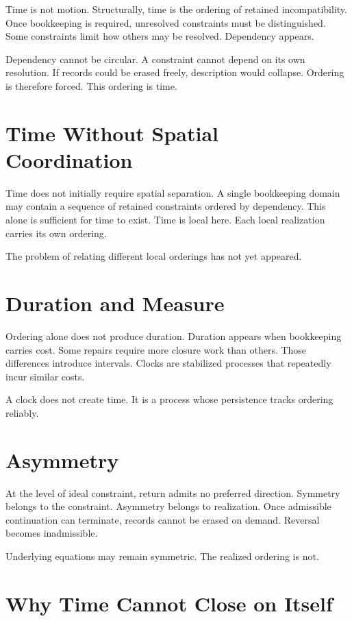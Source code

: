 \documentclass[11pt,twoside,openright]{book}
\begin{document}
Time is not motion. Structurally, time is the ordering of retained incompatibility. Once bookkeeping is required, unresolved constraints must be distinguished. Some constraints limit how others may be resolved. Dependency appears.

Dependency cannot be circular. A constraint cannot depend on its own resolution. If records could be erased freely, description would collapse. Ordering is therefore forced. This ordering is time.

\section*{Time Without Spatial Coordination}

Time does not initially require spatial separation. A single bookkeeping domain may contain a sequence of retained constraints ordered by dependency. This alone is sufficient for time to exist. Time is local here. Each local realization carries its own ordering.

The problem of relating different local orderings has not yet appeared.

\section*{Duration and Measure}

Ordering alone does not produce duration. Duration appears when bookkeeping carries cost. Some repairs require more closure work than others. Those differences introduce intervals. Clocks are stabilized processes that repeatedly incur similar costs.

A clock does not create time. It is a process whose persistence tracks ordering reliably.

\section*{Asymmetry}

At the level of ideal constraint, return admits no preferred direction. Symmetry belongs to the constraint. Asymmetry belongs to realization. Once admissible continuation can terminate, records cannot be erased on demand. Reversal becomes inadmissible.

Underlying equations may remain symmetric. The realized ordering is not.

\section*{Why Time Cannot Close on Itself}
\end{document}
